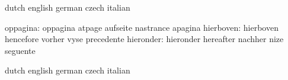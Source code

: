 
\startvariables            dutch                     english
                           german                    czech
                           italian

                 oppagina: oppagina                  atpage
                           aufseite                  nastrance
                           apagina
                hierboven: hierboven                 hencefore
                           vorher                    vyse
                           precedente
                hieronder: hieronder                 hereafter
                           nachher                   nize
                           seguente

\stopvariables




\startvariables            dutch                     english
                           german                    czech
                           italian

